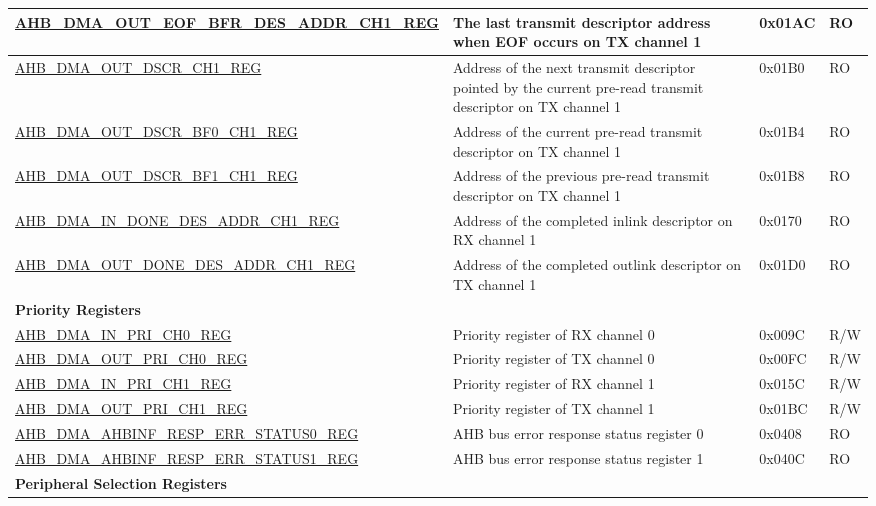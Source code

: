 \begin{longtable}{ | p{8cm} | p{8cm} | p{1.3cm} | p{1.5cm} | }
\hyperref[regdesc:AHBDMAOUTEOFBFRDESADDRCHNREG]{AHB\_DMA\_OUT\_EOF\_BFR\_DES\_ADDR\_CH1\_REG} & The last transmit descriptor address when EOF occurs on TX channel 1 & 0x01AC & RO \\ \hline
\hyperref[regdesc:AHBDMAOUTDSCRCHNREG]{AHB\_DMA\_OUT\_DSCR\_CH1\_REG} & Address of the next transmit descriptor pointed by the current pre-read transmit descriptor on TX channel 1 & 0x01B0 & RO \\ \hline
\hyperref[regdesc:AHBDMAOUTDSCRBF0CHNREG]{AHB\_DMA\_OUT\_DSCR\_BF0\_CH1\_REG} & Address of the current pre-read transmit descriptor on TX channel 1 & 0x01B4 & RO \\ \hline
\hyperref[regdesc:AHBDMAOUTDSCRBF1CHNREG]{AHB\_DMA\_OUT\_DSCR\_BF1\_CH1\_REG} & Address of the previous pre-read transmit descriptor on TX channel 1 & 0x01B8 & RO \\ \hline
\hyperref[regdesc:AHBDMAINDONEDESADDRCHNREG]{AHB\_DMA\_IN\_DONE\_DES\_ADDR\_CH1\_REG} & Address of the completed inlink descriptor on RX channel 1 & 0x0170 & RO \\ \hline
\hyperref[regdesc:AHBDMAOUTDONEDESADDRCHNREG]{AHB\_DMA\_OUT\_DONE\_DES\_ADDR\_CH1\_REG} & Address of the completed outlink descriptor on TX channel 1 & 0x01D0 & RO \\ \hline
\multicolumn{4}{|l|}{\textbf{Priority Registers}} \\ \hline
\hyperref[regdesc:AHBDMAINPRICHNREG]{AHB\_DMA\_IN\_PRI\_CH0\_REG} & Priority register of RX channel 0 & 0x009C & R/W \\ \hline
\hyperref[regdesc:AHBDMAOUTPRICHNREG]{AHB\_DMA\_OUT\_PRI\_CH0\_REG} & Priority register of TX channel 0 & 0x00FC & R/W \\ \hline
\hyperref[regdesc:AHBDMAINPRICHNREG]{AHB\_DMA\_IN\_PRI\_CH1\_REG} & Priority register of RX channel 1 & 0x015C & R/W \\ \hline
\hyperref[regdesc:AHBDMAOUTPRICHNREG]{AHB\_DMA\_OUT\_PRI\_CH1\_REG} & Priority register of TX channel 1 & 0x01BC & R/W \\ \hline
\hyperref[regdesc:AHBDMAAHBINFRESPERRSTATUS0REG]{AHB\_DMA\_AHBINF\_RESP\_ERR\_STATUS0\_REG} & AHB bus error response status register 0 & 0x0408 & RO \\ \hline
\hyperref[regdesc:AHBDMAAHBINFRESPERRSTATUS1REG]{AHB\_DMA\_AHBINF\_RESP\_ERR\_STATUS1\_REG} & AHB bus error response status register 1 & 0x040C & RO \\ \hline
\multicolumn{4}{|l|}{\textbf{Peripheral Selection Registers}} \\ \hline

\end{longtable}
